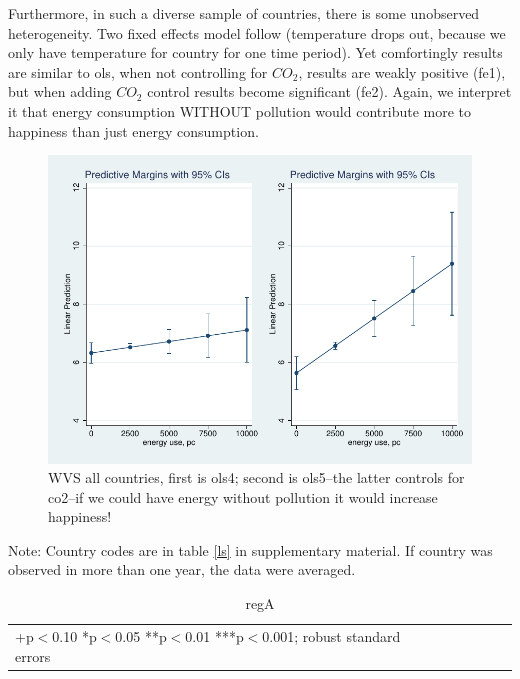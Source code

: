 \documentclass[10pt, letterpaper]{article}
\begin{document}
\begin{spacing}{1.4}
Furthermore, in such a diverse sample of countries, there is some unobserved
heterogeneity. Two fixed effects model follow (temperature drops out, because we
 only have temperature for country for one time period). Yet comfortingly
 results are similar to ols, when not controlling for $CO_2$, results are weakly
 positive (fe1), but when adding $CO_2$ control results become significant
 (fe2). Again, we interpret it  that energy consumption WITHOUT pollution would
 contribute more to happiness than just energy consumption.  

\begin{figure}[H]
 \includegraphics[width=6in]{graphsAndTables/ols4ols5.pdf}\centering
\caption{WVS all countries, first is ols4; second is ols5--the latter controls
  for co2--if we could have energy without pollution it would increase happiness! }\label{ols4ols5}
\end{figure}
{\scriptsize Note: Country codes are in table \ref{ls} in supplementary
  material. If country was observed in more than one year, the data were averaged.}


\begin{table}[H]\centering \caption{regA} \label{regA} \begin{scriptsize} \begin{tabular}{p{1.4in}p{.43in}p{.43in}p{.43in}p{.43in}p{.43in}p{.43in}p{.43in}p{.43in}p{.43in}p{.43 in}p{.43in}p{.43 in}}\hline  \hline\multicolumn{6}{l}{+p$<$0.10 *p$<$0.05 **p$<$0.01 ***p$<$0.001; robust standard errors} \end{tabular}\end{scriptsize}\end{table}


\end{spacing}
\end{document}
